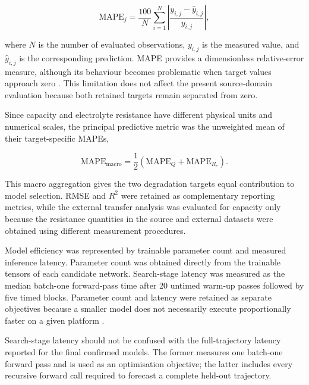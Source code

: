 \documentclass[a4paper,fleqn]{cas-sc}
\begin{document}
\begin{equation}
\mathrm{MAPE}_{j}
=
\frac{100}{N}
\sum_{i=1}^{N}
\left|
\frac{y_{i,j}-\hat{y}_{i,j}}
{y_{i,j}}
\right|,
\label{eq:mape}
\end{equation}

where $N$ is the number of evaluated observations, $y_{i,j}$ is the measured value, and $\hat{y}_{i,j}$ is the corresponding prediction. MAPE provides a dimensionless relative-error measure, although its behaviour becomes problematic when target values approach zero \cite{hyndman2006accuracy}. This limitation does not affect the present source-domain evaluation because both retained targets remain separated from zero.

Since capacity and electrolyte resistance have different physical units and numerical scales, the principal predictive metric was the unweighted mean of their target-specific MAPEs,

\begin{equation}
\mathrm{MAPE}_{\mathrm{macro}}
=
\frac{1}{2}
\left(
\mathrm{MAPE}_{Q}
+
\mathrm{MAPE}_{R_e}
\right).
\label{eq:macro_mape}
\end{equation}

This macro aggregation gives the two degradation targets equal contribution to model selection. RMSE and $R^2$ were retained as complementary reporting metrics, while the external transfer analysis was evaluated for capacity only because the resistance quantities in the source and external datasets were obtained using different measurement procedures.

Model efficiency was represented by trainable parameter count and measured inference latency. Parameter count was obtained directly from the trainable tensors of each candidate network. Search-stage latency was measured as the median batch-one forward-pass time after 20 untimed warm-up passes followed by five timed blocks. Parameter count and latency were retained as separate objectives because a smaller model does not necessarily execute proportionally faster on a given platform \cite{phan2024monas,tan2019mnasnet}.

Search-stage latency should not be confused with the full-trajectory latency reported for the final confirmed models. The former measures one batch-one forward pass and is used as an optimisation objective; the latter includes every recursive forward call required to forecast a complete held-out trajectory.

\end{document}

